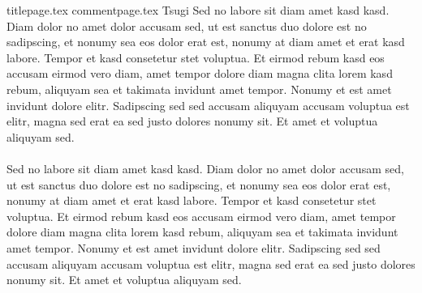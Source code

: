 \documentclass{article}
\begin{document}
	{titlepage.tex}
	{commentpage.tex}
	\newpage
	Tsugi
	\newpage
	Sed no labore sit diam amet kasd kasd. Diam dolor no amet dolor accusam sed, ut est sanctus duo dolore est no sadipscing, et nonumy sea eos dolor erat est, nonumy at diam amet et erat kasd labore. Tempor et kasd consetetur stet voluptua. Et eirmod rebum kasd eos accusam eirmod vero diam, amet tempor dolore diam magna clita lorem kasd rebum, aliquyam sea et takimata invidunt amet tempor. Nonumy et est amet invidunt dolore elitr. Sadipscing sed sed accusam aliquyam accusam voluptua est elitr, magna sed erat ea sed justo dolores nonumy sit. Et amet et voluptua aliquyam sed. \\\\
	Sed no labore sit diam amet kasd kasd. Diam dolor no amet dolor accusam sed, ut est sanctus duo dolore est no sadipscing, et nonumy sea eos dolor erat est, nonumy at diam amet et erat kasd labore. Tempor et kasd consetetur stet voluptua. Et eirmod rebum kasd eos accusam eirmod vero diam, amet tempor dolore diam magna clita lorem kasd rebum, aliquyam sea et takimata invidunt amet tempor. Nonumy et est amet invidunt dolore elitr. Sadipscing sed sed accusam aliquyam accusam voluptua est elitr, magna sed erat ea sed justo dolores nonumy sit. Et amet et voluptua aliquyam sed.
\end{document}
